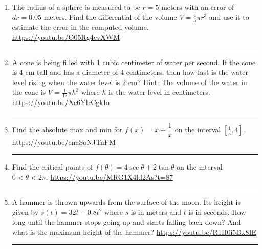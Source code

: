 \documentclass[12pt]{article}
\begin{document}
\begin{enumerate}
\item The radius of a sphere is measured to be $r = 5$ meters with an error of $dr = 0.05$ meters. Find the differential of the volume $V = \tfrac{4}{3} \pi r^3$ and use it to estimate the error in the computed volume. 
\vfill
\hfill \url{https://youtu.be/O05Rg4cvXWM}
\hrule


\newpage
\item A cone is being filled with 1 cubic centimeter of water per second.  If the cone is 4 cm tall and has a diameter of 4 centimeters, then how fast is the water level rising when the water level is 2 cm?  Hint: The volume of the water in the cone is $V = \tfrac{1}{12} \pi h^3$ where $h$ is the water level in centimeters.  
\vfill 
\hfill  \url{https://youtu.be/Xe6YlrCgkIo}
\hrule 


\item Find the absolute max and min for $f(x) = x + \dfrac{1}{x}$ on the interval $[\tfrac{1}{5}, 4].$
\vfill 
\hfill  \url{https://youtu.be/enaSoNJTnFM} 
\hrule 


\item Find the critical points of $f(\theta) = 4 \sec \theta + 2 \tan \theta$ on the interval $0  < \theta < 2\pi$. 
\vfill 
\hfill  \url{https://youtu.be/MRG1X4ld2As?t=87} 
\hrule 


\item A hammer is thrown upwards from the surface of the moon.  Its height is given by $s(t)  = 32t - 0.8t^2$ where $s$ is in meters and $t$ is in seconds.  How long until the hammer stops going up and starts falling back down? And what is the maximum height of the hammer?
\vfill 
\hfill  \url{https://youtu.be/R1H0i5Dx8IE} 
\hrule 

\end{enumerate}
\end{document}
